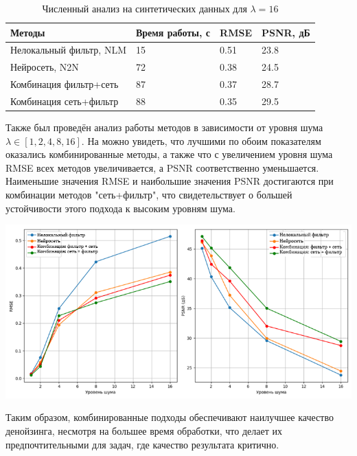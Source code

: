 \begin{table} [H]%
	\centering\small
	\caption{Численный анализ на синтетических данных для $\lambda=16$}%
	\label{tab:synthetic-denoise-16}
	\begin{tabular}{|l|l|l|l|}
		\hline
		Методы&Время работы, с&RMSE&PSNR, дБ\\
		\hline
		Нелокальный фильтр, NLM
		&15&0.51&23.8\\ \hline
		Нейросеть, N2N&72&0.38&24.5\\ \hline
		Комбинация фильтр+сеть
		&87&0.37&28.7\\ \hline Комбинация сеть+фильтр
		&88&0.35&29.5\\ \hline		
	\end{tabular}
	\normalsize%
\end{table}
\par Также был проведён анализ работы методов в зависимости от уровня шума $\lambda \in [1, 2, 4, 8, 16]$. На  можно увидеть, что лучшими по обоим показателям оказались комбинированные методы, а также что с увеличением уровня шума RMSE всех методов увеличивается, а PSNR соответственно уменьшается. Наименьшие значения RMSE и наибольшие значения PSNR достигаются при комбинации методов "сеть+фильтр", что свидетельствует о большей устойчивости этого подхода к высоким уровням шума.
\begin{minipage}{\textwidth}
	\centering
	\vspace{\mfloatsep} %
	\includegraphics[keepaspectratio=true,scale=0.87] {my_folder/images/denoising/metrics_noise.png}
	\label{fig:synthetic-denoise-16-all}  
	\vspace{\mfloatsep} %
\end{minipage}
\par Таким образом, комбинированные подходы обеспечивают наилучшее качество денойзинга, несмотря на большее время обработки, что делает их предпочтительными для задач, где качество результата критично.
